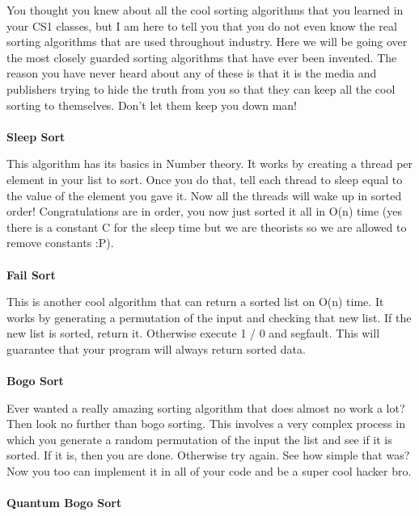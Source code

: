 \documentclass[9pt]{extarticle} %
\begin{document}
%
%
\begin{minipage}[t]{.61\linewidth} %
\vspace{-0.4cm}
\hypertarget{firstnews}{}

You thought you knew about all the cool sorting algorithms that you learned in your CS1 classes, but
I am here to tell you that you do not even know the real sorting algorithms that are used throughout
industry. Here we will be going over the most closely guarded sorting algorithms that have ever been
invented. The reason you have never heard about any of these is that it is the media and publishers
trying to hide the truth from you so that they can keep all the cool sorting to themselves. Don't
let them keep you down man!
\\
\\
\textbf{Sleep Sort}

This algorithm has its basics in Number theory. It works by creating a thread per element in your
list to sort. Once you do that, tell each thread to sleep equal to the value of the element you gave
it. Now all the threads will wake up in sorted order! Congratulations are in order, you now just
sorted it all in O(n) time (yes there is a constant C for the sleep time but we are theorists so we
are allowed to remove constants :P).
\\
\\
\textbf{Fail Sort}

This is another cool algorithm that can return a sorted list on O(n) time. It works by generating a
permutation of the input and checking that new list. If the new list is sorted, return it. Otherwise
execute 1 / 0 and segfault. This will guarantee that your program will always return sorted data.
\\
\\
\textbf{Bogo Sort}

Ever wanted a really amazing sorting algorithm that does almost no work a lot? Then look no further
than bogo sorting. This involves a very complex process in which you generate a random permutation
of the input the list and see if it is sorted. If it is, then you are done. Otherwise try again. See
how simple that was? Now you too can implement it in all of your code and be a super cool hacker
bro.
\\
\\
\textbf{Quantum Bogo Sort}


\end{minipage}
\end{document}
